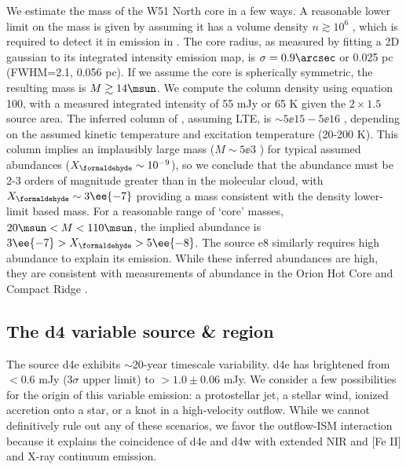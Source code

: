 We estimate the mass of the W51 North core in a few ways.  A reasonable lower limit
on the mass is given by assuming it has a volume density $n\gtrsim10^6$ \percc,
which is required to detect it in emission in \ortho \twotwo
\citep{Mangum1993a}.  The core radius, as measured by fitting a 2D gaussian to
its integrated intensity emission map, is
$\sigma=0.9\arcsec$ or 0.025 pc (FWHM=2.1\arcsec, 0.056 pc).  If we assume the core
is spherically symmetric, the resulting mass is $M\gtrsim14\msun$.
We compute the \ortho \twotwo column density using \citet{Mangum2015a} equation
100, with a measured integrated intensity of 55 mJy \kms or 65 K \kms given
the $2\times1.5$\arcsec source area.  The inferred column of \ortho,
assuming LTE, is $\sim5\ee{15} - 5\ee{16}$ \persc, depending on the assumed
kinetic temperature and excitation temperature (20-200 K).  This \formaldehyde column
implies an implausibly large mass ($M\sim5\ee{3}$ \msun) for typical assumed abundances
($X_{\formaldehyde}\sim10^{-9}$), so we conclude that the \formaldehyde abundance
must be 2-3 orders of magnitude greater than in the molecular cloud, with
$X_{\formaldehyde}\sim3\ee{-7}$ providing a mass consistent with the density
lower-limit based mass.  For a reasonable range of `core' masses, $20
\msun<M<110 \msun$, the implied abundance is $3\ee{-7} > X_{\formaldehyde} >
5\ee{-8}$.  The source e8 similarly requires high abundance to explain its
emission.  While these inferred abundances are high, they are consistent with
measurements of \formaldehyde abundance in the Orion Hot Core and Compact Ridge
\citep{Mangum1993b}.





\subsection{The d4 variable source \& \hh region}
\label{sec:d4}
The source d4e exhibits $\sim$20-year timescale variability.  d4e has
brightened from $<0.6$ mJy ($3\sigma$ upper limit) to $>1.0\pm0.06$ mJy.  We
consider a few possibilities for the origin of this variable emission: a
protostellar jet,  a stellar wind, ionized accretion onto a star, or a knot in
a high-velocity outflow.  While we cannot definitively rule out any of these
scenarios, we favor the outflow-ISM interaction because it explains the
coincidence of d4e and d4w with extended NIR \hh and [Fe II] and X-ray
continuum emission.

